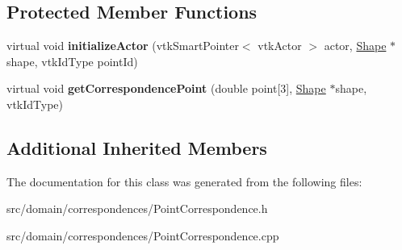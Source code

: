 \subsection*{Protected Member Functions}
\begin{DoxyCompactItemize}
\item 
\hypertarget{class_point_correspondence_a474f835c1093311ae7c240b6db096531}{}virtual void {\bfseries initialize\+Actor} (vtk\+Smart\+Pointer$<$ vtk\+Actor $>$ actor, \hyperlink{class_shape}{Shape} $\ast$shape, vtk\+Id\+Type point\+Id)\label{class_point_correspondence_a474f835c1093311ae7c240b6db096531}

\item 
\hypertarget{class_point_correspondence_abafeb29cdc31f70e1848a78ffe410f26}{}virtual void {\bfseries get\+Correspondence\+Point} (double point\mbox{[}3\mbox{]}, \hyperlink{class_shape}{Shape} $\ast$shape, vtk\+Id\+Type)\label{class_point_correspondence_abafeb29cdc31f70e1848a78ffe410f26}

\end{DoxyCompactItemize}
\subsection*{Additional Inherited Members}


The documentation for this class was generated from the following files\+:\begin{DoxyCompactItemize}
\item 
src/domain/correspondences/Point\+Correspondence.\+h\item 
src/domain/correspondences/Point\+Correspondence.\+cpp\end{DoxyCompactItemize}
